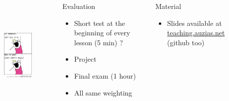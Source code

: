 \documentclass{beamer}
\begin{document}
  \begin{frame}
    \begin{columns}
	\begin{figure}[t]
	  \centering
	  \includegraphics[height=5cm]{./imgs/marks.jpg}
	  \label{fig:marks}
	\end{figure}
	\begin{block}{Evaluation}
	  \begin{itemize}
	    \item Short test at the beginning of every lesson (5 min) ?
	    \item Project
	    \item Final exam (1 hour)
	    \item All same weighting
	  \end{itemize}
	\end{block}
	\begin{block}{Material}
	  \begin{itemize}
	    \item Slides available at \color{blue}\href{http://teaching.auzias.net}{teaching.auzias.net} \color{black} (github too)
	  \end{itemize}
	\end{block}
    \end{columns}
  \end{frame}







\end{document}
